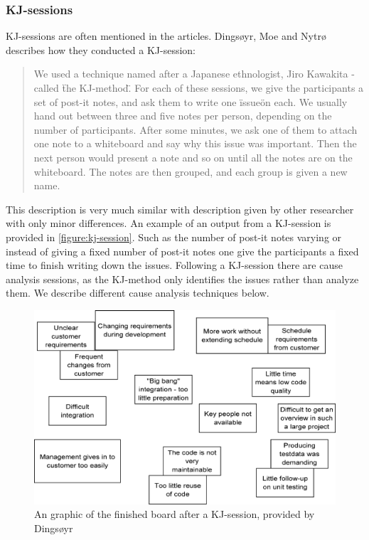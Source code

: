 \documentclass[12pt]{article}
\begin{document}
\subsubsection{KJ-sessions}
KJ-sessions are often mentioned in the articles. Dingsøyr, Moe and Nytrø~\cite{Moe2001} describes how they conducted a KJ-session: 
\begin{quote} We used a technique named after a Japanese ethnologist, Jiro Kawakita - called \"the KJ-method\". For each of these sessions, we give the participants a set of post-it notes, and ask them to write one \"issue\" on each. We usually hand out between three and five notes per person, depending on the number of participants. After some minutes, we ask one of them to attach one note to a whiteboard and say why this issue was important. Then the next person would present a note and so on until all the notes are on the whiteboard. The notes are then grouped, and each group is given a new name. 
\end{quote}
This description is very much similar with description given by other researcher with only minor differences. An example of an output from a KJ-session is provided in \autoref{figure:kj-session}. Such as the number of post-it notes varying or instead of giving a fixed number of post-it notes one give the participants a fixed time to finish writing down the issues. Following a KJ-session there are cause analysis sessions, as the KJ-method only identifies the issues rather than analyze them. We describe different cause analysis techniques below. 

\begin{figure}[h!]
	\centering
	\includegraphics[width=\textwidth]{figures/KJ-session.png}
	\caption{An graphic of the finished board after a KJ-session, provided by Dingsøyr~\cite{Dingsoyr2005}}
	\label{figure:kj-session}
\end{figure}
\end{document}
